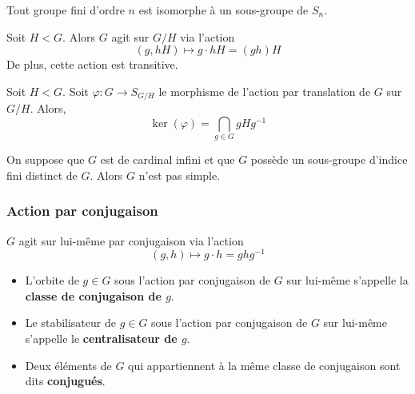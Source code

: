 	\begin{application}
		Tout groupe fini d'ordre $n$ est isomorphe à un sous-groupe de $S_n$.
	\end{application}

	\begin{proposition}
		Soit $H < G$. Alors $G$ agit sur $G/H$ via l'action
		\[ (g, hH) \mapsto g \cdot hH = (gh)H \]
		De plus, cette action est transitive.
	\end{proposition}

	\begin{proposition}
		Soit $H < G$. Soit $\varphi : G \rightarrow S_{G/H}$ le morphisme de l'action par translation de $G$ sur $G/H$. Alors,
		\[ \ker(\varphi) = \bigcap_{g \in G} gHg^{-1} \]
	\end{proposition}


	\begin{application}
		On suppose que $G$ est de cardinal infini et que $G$ possède un sous-groupe d'indice fini distinct de $G$. Alors $G$ n'est pas simple.
	\end{application}
	
	\subsubsection{Action par conjugaison}
	
	
	\begin{proposition}
		$G$ agit sur lui-même par conjugaison via l'action
		\[ (g, h) \mapsto g \cdot h = ghg^{-1} \]
	\end{proposition}

	\begin{definition}
		\begin{itemize}
			\item L'orbite de $g \in G$ sous l'action par conjugaison de $G$ sur lui-même s'appelle la \textbf{classe de conjugaison de $g$}.
			\item Le stabilisateur de $g \in G$ sous l'action par conjugaison de $G$ sur lui-même s'appelle le \textbf{centralisateur de $g$}.
			\item Deux éléments de $G$ qui appartiennent à la même classe de conjugaison sont dits \textbf{conjugués}.
		\end{itemize}
	\end{definition}

	
